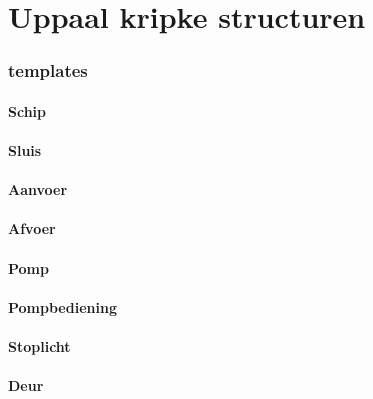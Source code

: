 \section{Uppaal kripke structuren}


\subsubsection{templates}

\paragraph{Schip}

\paragraph{Sluis}


\paragraph{Aanvoer}


\paragraph{Afvoer}

\paragraph{Pomp}

\paragraph{Pompbediening}


\paragraph{Stoplicht}

\paragraph{Deur}









